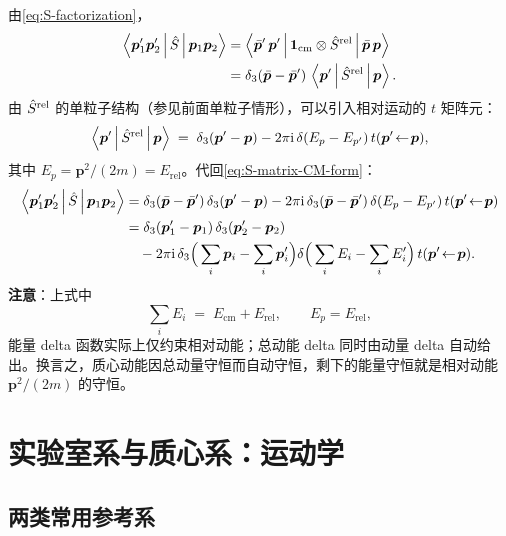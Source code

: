 由\eqref{eq:S-factorization}，
\begin{align}
  \left\langle \bm{p}_1'\bm{p}_2' \,\middle|\, \hat{S} \,\middle|\, \bm{p}_1\bm{p}_2 \right\rangle
  &= \left\langle \bar{\bm{p}}'\,\bm{p}' \,\middle|\, \mathbf{1}_{\text{cm}}\otimes\hat{S}^{\text{rel}} \,\middle|\, \bar{\bm{p}}\,\bm{p} \right\rangle \notag\\
  &= \delta_3(\bar{\bm{p}}-\bar{\bm{p}}')\,\left\langle \bm{p}' \,\middle|\, \hat{S}^{\text{rel}} \,\middle|\, \bm{p} \right\rangle.
  \label{eq:S-matrix-CM-form}
\end{align}
由 $\hat{S}^{\text{rel}}$ 的单粒子结构（参见前面单粒子情形），可以引入相对运动的 $t$ 矩阵元：
\begin{equation}
  \left\langle \bm{p}' \,\middle|\, \hat{S}^{\text{rel}} \,\middle|\, \bm{p} \right\rangle
  \;=\; \delta_3(\bm{p}'-\bm{p}) - 2\pi\mathrm{i}\,\delta(E_p-E_{p'})\,t(\bm{p}'\!\leftarrow\!\bm{p}),
  \label{eq:t-matrix-rel}
\end{equation}
其中 $E_p=\bm{p}^2/(2m)=E_{\text{rel}}$。代回\eqref{eq:S-matrix-CM-form}：
\begin{align}
  \left\langle \bm{p}_1'\bm{p}_2' \,\middle|\, \hat{S} \,\middle|\, \bm{p}_1\bm{p}_2 \right\rangle
  &= \delta_3(\bar{\bm{p}}-\bar{\bm{p}}')\,\delta_3(\bm{p}'-\bm{p})
     -2\pi\mathrm{i}\,\delta_3(\bar{\bm{p}}-\bar{\bm{p}}')\,\delta(E_p-E_{p'})\,t(\bm{p}'\!\leftarrow\!\bm{p}) \notag\\
  &= \delta_3(\bm{p}_1'-\bm{p}_1)\,\delta_3(\bm{p}_2'-\bm{p}_2) \notag\\
  &\quad -2\pi\mathrm{i}\,\delta_3\Big(\sum_i\bm{p}_i-\sum_i\bm{p}_i'\Big)
     \delta\Big(\sum_i E_i-\sum_i E_i'\Big)\,t(\bm{p}'\!\leftarrow\!\bm{p}).
  \label{eq:S-matrix-final}
\end{align}
\textbf{注意}：上式中
\begin{equation}
  \sum_i E_i \;=\; E_{\text{cm}} + E_{\text{rel}}, \qquad E_p=E_{\text{rel}},
\end{equation}
能量 delta 函数实际上仅约束相对动能；总动能 delta 同时由动量 delta 自动给出。换言之，质心动能因总动量守恒而自动守恒，剩下的能量守恒就是相对动能 $\bm{p}^2/(2m)$ 的守恒。

\section{实验室系与质心系：运动学}

\subsection{两类常用参考系}

